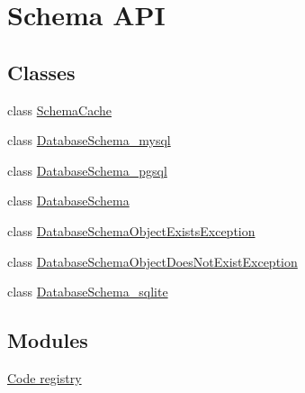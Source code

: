 \hypertarget{group__schemaapi}{
\section{Schema API}
\label{group__schemaapi}
}
\subsection*{Classes}
\begin{DoxyCompactItemize}
\item 
class \hyperlink{classSchemaCache}{SchemaCache}
\item 
class \hyperlink{classDatabaseSchema__mysql}{DatabaseSchema\_\-mysql}
\item 
class \hyperlink{classDatabaseSchema__pgsql}{DatabaseSchema\_\-pgsql}
\item 
class \hyperlink{classDatabaseSchema}{DatabaseSchema}
\item 
class \hyperlink{classDatabaseSchemaObjectExistsException}{DatabaseSchemaObjectExistsException}
\item 
class \hyperlink{classDatabaseSchemaObjectDoesNotExistException}{DatabaseSchemaObjectDoesNotExistException}
\item 
class \hyperlink{classDatabaseSchema__sqlite}{DatabaseSchema\_\-sqlite}
\end{DoxyCompactItemize}
\subsection*{Modules}
\begin{DoxyCompactItemize}
\item 
\hyperlink{group__registry}{Code registry}
\end{DoxyCompactItemize}

